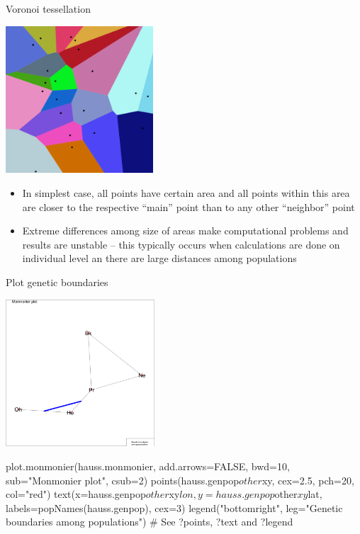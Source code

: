 \documentclass[compress, ucs, xelatex, 11pt, xcolor=svgnames,
  hyperref={
    bookmarks=true,
    unicode=true,
    colorlinks=true,
    pdftitle={Molecular data in R},
    plainpages=false,
    pdfauthor={Vojtech Zeisek},
    pdfsubject={Course about phylogeny and evolution in R},
    pdfcreator={XeLaTeX},
    pdfkeywords={R, evolution, phylogeny, molecular data},
    linkcolor=Tomato,
    anchorcolor=SaddleBrown,
    citecolor=Goldenrod,
    filecolor=DarkMagenta,
    menucolor=Sienna,
    urlcolor=DarkTurquoise,
    pdftex},
  url={hyphens, lowtilde} %
  ]{beamer}
\begin{document}
\begin{frame}{Voronoi tessellation}
  \begin{multicols}{2}
    \includegraphics[height=5.5cm]{voronoi_diagram.png}
    \begin{itemize}
      \item In simplest case, all points have certain area and all points within this area are closer to the respective ``main'' point than to any other ``neighbor'' point
      \item Extreme differences among size of areas make computational problems and results are unstable -- this typically occurs when calculations are done on individual level an there are large distances among populations
    \end{itemize}
  \end{multicols}
\end{frame}

\begin{frame}[fragile]{Plot genetic boundaries}
\begin{multicols}{2}
  \includegraphics[height=5.5cm]{monmonier.png}
  \begin{spluscode}
    plot.monmonier(hauss.monmonier,
      add.arrows=FALSE, bwd=10,
      sub="Monmonier plot", csub=2)
    points(hauss.genpop$other$xy,
      cex=2.5, pch=20, col="red")
    text(x=hauss.genpop$other$xy$lon,
      y=hauss.genpop$other$xy$lat,
      labels=popNames(hauss.genpop),
      cex=3)
    legend("bottomright",
      leg="Genetic boundaries\n
      among populations")
    # See ?points, ?text and ?legend
  \end{spluscode}
\end{multicols}
\end{frame}
\end{document}
